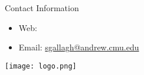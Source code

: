 \documentclass[final]{beamer}
\newlength{\onecolwid}
\begin{document}
\begin{frame}[t]
\begin{columns}[t]
\begin{column}{\onecolwid}


\begin{alertblock}{Contact Information}

\begin{itemize}
\item Web: 
\item Email: \href{mailto:sgallagh@andrew.cmu.edu}{sgallagh@andrew.cmu.edu}
\end{itemize}

\end{alertblock}

\begin{center}

\texttt{[image: logo.png]} 

\end{center}


\end{column} %

\end{columns} %

\end{frame} %
\end{document}
